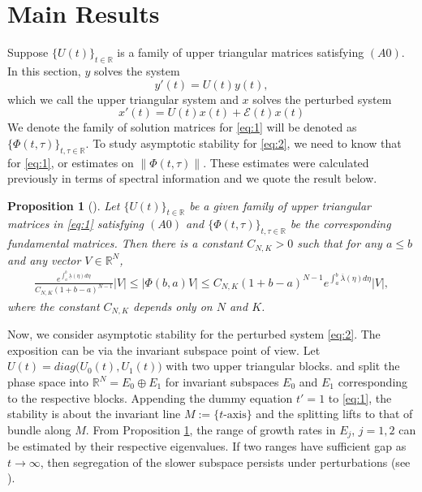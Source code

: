 \documentclass[a4paper,11pt]{article}
\newcommand{\upl}{\overline{\lambda}}
\newcommand{\udl}{\underline{\lambda}}
\newcommand{\E}{\mathcal{E}}
\newcounter{Theorem}
\newtheorem{proposition}[Theorem]{Proposition}
\theoremstyle{remark}
\begin{document}
\section{Main Results} \label{sec:MainRes}
Suppose $\{U(t)\}_{t \in \mathbb{R}}$ is a family of upper triangular matrices satisfying $(A0)$. In this section, $y$ solves the system 
\begin{equation}\label{eq:1}
y'(t)=U(t)y(t),
\end{equation}
which we call the upper triangular system and $x$ solves the perturbed system
\begin{equation}\label{eq:2}
x'(t) = U(t)x(t) + \E(t)x(t)
\end{equation}
We denote the family of solution matrices for \eqref{eq:1} will be denoted as $\{\Phi(t,\tau)\}_{t,\tau \in \mathbb{R}}$. To study asymptotic stability for \eqref{eq:2}, we need to know that for \eqref{eq:1}, or estimates on $\|\Phi(t,\tau)\|$. These estimates were calculated previously in terms of spectral information \cite{L19} and we quote the result below.
\begin{proposition}[\cite{L19}]\label{stability} Let $\{U(t)\}_{t \in \mathbb{R}}$ be a given family of upper triangular matrices in \eqref{eq:1} satisfying $(A0)$ and $\{\Phi(t,\tau)\}_{t,\tau \in \mathbb{R}}$ be the corresponding fundamental matrices. Then there is a constant $C_{N,K}>0$ such that for any $a \le b$ and any vector $V \in \mathbb{R}^N$,
\begin{equation} \label{stabestim}
\begin{aligned}
\frac{e^{\int_a^b \udl(\eta) d\eta}}{C_{N,K}(1+b-a)^{N-1}}|V| \le |\Phi(b,a)V|
\le C_{N,K}(1+b-a)^{N-1}e^{\int_a^b \upl(\eta) d\eta}|V|, 
\end{aligned}
\end{equation}
where the constant $C_{N,K}$ depends only on $N$ and $K$. 
\end{proposition}

Now, we consider asymptotic stability for the perturbed system \eqref{eq:2}. The exposition can be via the invariant subspace point of view. Let $U(t)=diag\big(U_0(t),U_1(t)\big)$ with two upper triangular blocks. and split the phase space into $\mathbb{R}^N=E_0\oplus E_1$ for invariant subspaces $E_0$ and $E_1$ corresponding to the respective blocks. Appending the dummy equation $t'=1$ to \eqref{eq:1}, the stability is about the invariant line $M:=\text{$\{t$-axis$\}$}$ and the splitting lifts to that of bundle along $M$. From Proposition \ref{stability}, the range of growth rates in $ E_j$, $j=1,2$ can be estimated by their respective eigenvalues. If two ranges have sufficient gap as $t \rightarrow \infty$, then segregation of the slower subspace persists under perturbations (see \cite[Theorem 1]{L19}).
\end{document}

